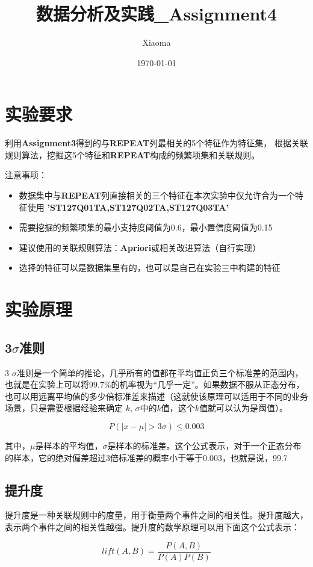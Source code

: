 \documentclass[12pt, a4paper, oneside]{ctexart}
\title{数据分析及实践\_Assignment4}
\author{Xiaoma}
\date{\today}
\begin{document}
\maketitle
\section{实验要求}
利用\textbf{Assignment3}得到的与\textbf{REPEAT}列最相关的5个特征作为特征集，
根据关联规则算法，挖掘这5个特征和\textbf{REPEAT}构成的频繁项集和关联规则。

注意事项：
\begin{itemize}
    \item 数据集中与\textbf{REPEAT}列直接相关的三个特征在本次实验中仅允许合为一个特征使用 \textbf{'ST127Q01TA,ST127Q02TA,ST127Q03TA'}
    \item 需要挖掘的频繁项集的最小支持度阈值为0.6，最小置信度阈值为0.15
    \item 建议使用的关联规则算法：\textbf{Apriori}或相关改进算法（自行实现）
    \item 选择的特征可以是数据集里有的，也可以是自己在实验三中构建的特征
\end{itemize}
\newpage
\section{实验原理}
\subsection{3$\sigma$准则}
3 $\sigma$准则是一个简单的推论，几乎所有的值都在平均值正负三个标准差的范围内，也就是在实验上可以将99.7\%的机率视为“几乎一定”。如果数据不服从正态分布，也可以用远离平均值的多少倍标准差来描述（这就使该原理可以适用于不同的业务场景，只是需要根据经验来确定 $k$, $\sigma$中的$k$值，这个$k$值就可以认为是阈值）。


$$P(|x-\mu|>3\sigma)\leq0.003$$

其中，$\mu$是样本的平均值，$\sigma$是样本的标准差。这个公式表示，对于一个正态分布的样本，它的绝对偏差超过3倍标准差的概率小于等于0.003，也就是说，99.7%

\subsection{提升度}
提升度是一种关联规则中的度量，用于衡量两个事件之间的相关性。提升度越大，表示两个事件之间的相关性越强。提升度的数学原理可以用下面这个公式表示：

$$lift(A,B)=\frac{P(A,B)}{P(A)P(B)}$$
\end{document}
